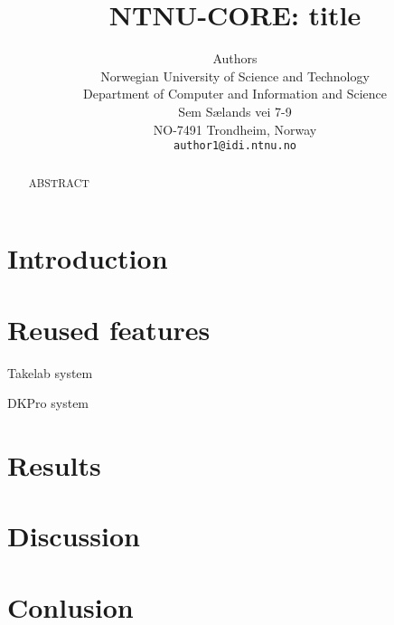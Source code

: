 \documentclass[11pt,letterpaper]{article}
\title{NTNU-CORE: title}
\author{Authors\\
  Norwegian University of Science and Technology\\
  Department of Computer and Information and Science\\
  Sem S{\ae}lands vei 7-9 \\
  NO-7491 Trondheim, Norway\\
  {\tt author1@idi.ntnu.no}}
\date{}
\begin{document}
\maketitle
\begin{abstract}
ABSTRACT
\end{abstract}

\section{Introduction}



\section{Reused features}

Takelab system \cite{vsaric2012takelab}

DKPro system \cite{bar2012ukp}











\section{Results}


\section{Discussion}


\section{Conlusion}




\end{document}
